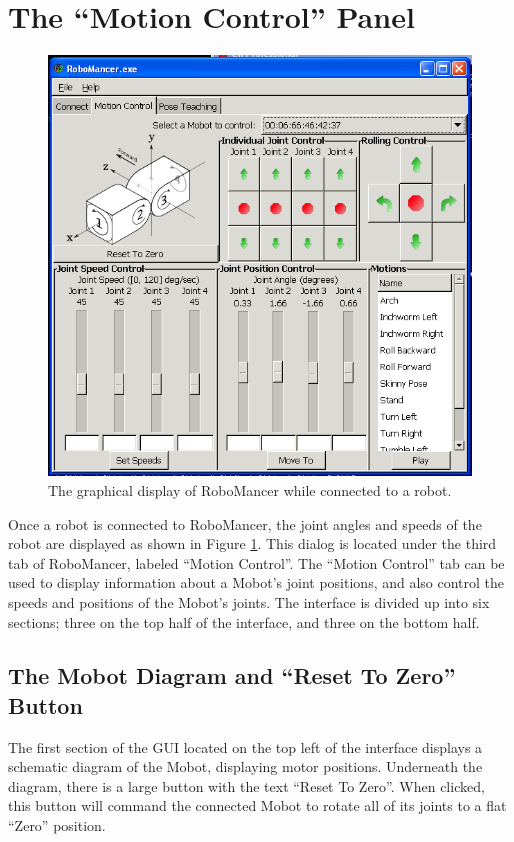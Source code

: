 \documentclass{article}
\begin{document}
\section{ The ``Motion Control'' Panel}
\begin{figure}[H]
\begin{center}
\includegraphics[width=4.5in]{images/robomancer_screenshot5.png}
\end{center}
\caption{\label{fig:shot1_populated.png} The graphical display of RoboMancer
while connected to a robot.}
\end{figure}

Once a robot is connected to RoboMancer, the joint angles and speeds
of the robot are displayed as shown in Figure \ref{fig:shot1_populated.png}.
This dialog is located under the third tab of RoboMancer, labeled 
``Motion Control''.
The ``Motion Control'' tab can be
used to display
information about a Mobot's joint positions, and also control the
speeds and positions of the Mobot's joints. The interface is divided
up into six sections; three on the top half of the interface, and three on 
the bottom half. 

\subsection{The Mobot Diagram and ``Reset To Zero'' Button}
The first section of the GUI located on the top left of the interface
displays a schematic diagram of the Mobot, displaying motor positions.
Underneath the diagram, there is a large button with the text 
``Reset To Zero''. When clicked, this button will command the connected
Mobot to rotate all of its joints to a flat ``Zero'' position.
\end{document}
